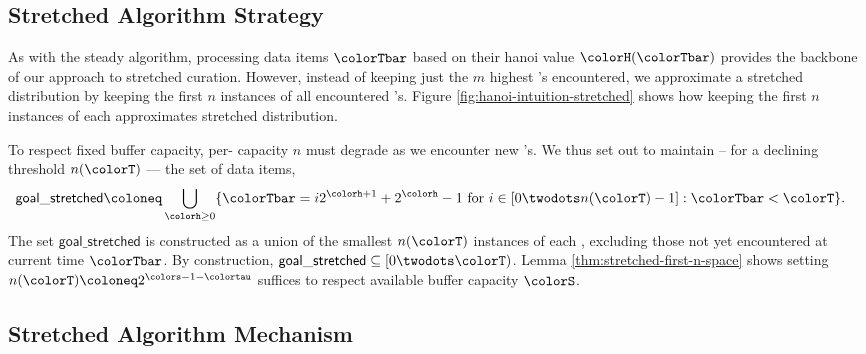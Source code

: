 
\subsection{Stretched Algorithm Strategy}
\label{sec:stretched-strategy}

As with the steady algorithm, processing data items $\colorTbar$ based on their hanoi value $\colorH(\colorTbar)$ provides the backbone of our approach to stretched curation.
However, instead of keeping just the $m$ highest \hv{}'s encountered, we approximate a stretched distribution by keeping the first $n$ instances of all encountered \hv{}'s.
Figure \ref{fig:hanoi-intuition-stretched} shows how keeping the first $n$ instances of each \hv{} approximates stretched distribution.

To respect fixed buffer capacity, per-\hv{} capacity $n$ must degrade as we encounter new \hv{}'s.
We thus set out to maintain -- for a declining threshold $n(\colorT)$ --- the set of data items,
\begin{align*}
\mathsf{goal\_stretched}
&\coloneq
\bigcup_{\colorh \geq 0}
\{ \colorTbar = i2^{\colorh + 1} + 2^{\colorh} - 1 \text{ for } i \in [0 \twodots n(\colorT) - 1] : \colorTbar < \colorT \}.
\end{align*}
The set $\mathsf{goal\_stretched}$ is constructed as a union of the smallest $n(\colorT)$ instances of each \hv{}, excluding those not yet encountered at current time $\colorTbar$.
By construction, $\mathsf{goal\_stretched} \subseteq [0 \twodots \colorT)$.
Lemma \ref{thm:stretched-first-n-space} shows setting $n(\colorT) \coloneq 2^{\colors - 1 - \colortau}$ suffices to respect available buffer capacity $\colorS$.


\FloatBarrier  %


\subsection{Stretched Algorithm Mechanism}
\label{sec:stretched-mechanism}

